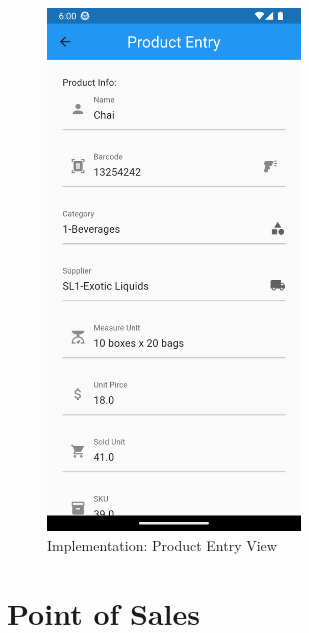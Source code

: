 \documentclass[../thesis.tex]{subfiles}
\begin{document}
\begin{figure}[H]
    \centering
    \includegraphics[width=0.60\textwidth]{images/ProductScreen_FormEntry.png}
    \caption{Implementation: Product Entry View}
    \label{fig:ProductScreen_FormEntry}
\end{figure}

\section{Point of Sales}
\end{document}
